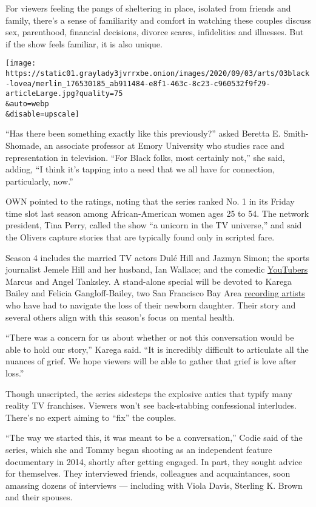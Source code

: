 For viewers feeling the pangs of sheltering in place, isolated from
friends and family, there's a sense of familiarity and comfort in
watching these couples discuss sex, parenthood, financial decisions,
divorce scares, infidelities and illnesses. But if the show feels
familiar, it is also unique.

\texttt{[image: https://static01.graylady3jvrrxbe.onion/images/2020/09/03/arts/03black-lovea/merlin\_176530185\_ab911484-e8f1-463c-8c23-c960532f9f29-articleLarge.jpg?quality=75\\\&auto=webp\\\&disable=upscale]}

``Has there been something exactly like this previously?'' asked Beretta
E. Smith-Shomade, an associate professor at Emory University who studies
race and representation in television. ``For Black folks, most certainly
not,'' she said, adding, ``I think it's tapping into a need that we all
have for connection, particularly, now.''

OWN pointed to the ratings, noting that the series ranked No. 1 in its
Friday time slot last season among African-American women ages 25 to 54.
The network president, Tina Perry, called the show ``a unicorn in the TV
universe,'' and said the Olivers capture stories that are typically
found only in scripted fare.

Season 4 includes the married TV actors Dulé Hill and Jazmyn Simon; the
sports journalist Jemele Hill and her husband, Ian Wallace; and the
comedic
\href{https://www.youtube.com/channel/UC6qABjcDkIUgYFkTKrCEXyg}{YouTubers}
Marcus and Angel Tanksley. A stand-alone special will be devoted to
Karega Bailey and Felicia Gangloff-Bailey, two San Francisco Bay Area
\href{https://soldevelopment.bandcamp.com/}{recording artists} who have
had to navigate the loss of their newborn daughter. Their story and
several others align with this season's focus on mental health.

``There was a concern for us about whether or not this conversation
would be able to hold our story,'' Karega said. ``It is incredibly
difficult to articulate all the nuances of grief. We hope viewers will
be able to gather that grief is love after loss.''

Though unscripted, the series sidesteps the explosive antics that typify
many reality TV franchises. Viewers won't see back-stabbing confessional
interludes. There's no expert aiming to ``fix'' the couples.

``The way we started this, it was meant to be a conversation,'' Codie
said of the series, which she and Tommy began shooting as an independent
feature documentary in 2014, shortly after getting engaged. In part,
they sought advice for themselves. They interviewed friends, colleagues
and acquaintances, soon amassing dozens of interviews --- including with
Viola Davis, Sterling K. Brown and their spouses.

